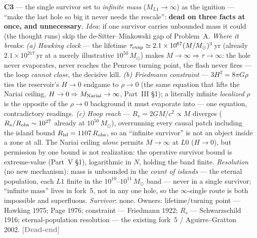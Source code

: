 \documentclass[11pt]{article}
\newcommand{\dead}{\textcolor{gray}{\textbf{[Dead-end]}}}
\newcommand{\msun}{M_\odot}
\begin{document}
\textbf{C3} --- the single survivor set to \emph{infinite mass} ($M_{L1}\to\infty$) as the ignition --- ``make the last hole so big it never needs the rescale'': \textbf{dead on three facts at once, and unnecessary}. \emph{Idea}: if one survivor carries unbounded mass it could (the thought runs) skip the de-Sitter--Minkowski gap of Problem~A. \emph{Where it breaks}: \emph{(a) Hawking clock} --- the lifetime $\tau_{\rm evap}\simeq2.1\times10^{67}(M/\msun)^3$\,yr (already $2.1\times10^{217}$\,yr at a merely illustrative $10^{50}\,\msun$) makes $M\to\infty\Rightarrow\tau\to\infty$: the hole never evaporates, never reaches the Penrose turning point, the flash never fires --- the loop \emph{cannot close}, the decisive kill. \emph{(b) Friedmann constraint} --- $3H^2=8\pi G\rho$ ties the reservoir's $H\to0$ endgame to $\rho\to0$ (the same equation that lifts the Nariai ceiling, $H\to0\Rightarrow M_{\rm Nariai}\to\infty$, Part~III \S1); a literally infinite \emph{localized} $\rho$ is the opposite of the $\rho\to0$ background it must evaporate into --- one equation, contradictory readings. \emph{(c) Hoop reach} --- $R_s=2GM/c^2\propto M$ diverges ($R_s/R_{\rm obs}\sim10^{27}$ already at $10^{50}\,\msun$), overrunning every causal patch including the island bound $R_{\rm isl}=1107\,R_{\rm obs}$, so an ``infinite survivor'' is not an object inside a zone at all. The Nariai ceiling \emph{alone} permits $M\to\infty$ at $L0$ ($H\to0$), but permission by one bound is not realization: the operative survivor bound is extreme-value (Part~V \S1), logarithmic in $N$, holding the band finite. \emph{Resolution} (no new mechanism): mass is unbounded in the \emph{count of islands} --- the eternal population, each $L1$ finite in the $10^{10}$--$10^{11}\,\msun$ band --- never in a single survivor; ``infinite mass'' lives in fork~5, not in any one hole, so the $\infty$-single route is both impossible and superfluous. \emph{Survivor}: none. Owners: lifetime/turning point --- Hawking 1975; Page 1976; constraint --- Friedmann 1922; $R_s$ --- Schwarzschild 1916; eternal-population resolution --- the existing fork~5 / Aguirre--Gratton 2002. \dead\quad
\end{document}
